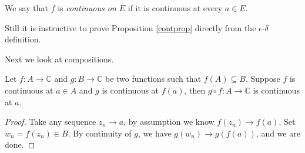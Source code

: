 \begin{note}
    We say that \(f\) is \textit{continuous on \(E\)} if it is continuous at every \(a \in E\).
\end{note}
\begin{remark}
    Still it is instructive to prove Proposition \eqref{contprop} directly from the \(\epsilon\)-\(\delta\) definition.
\end{remark}
Next we look at compositions.
\begin{theorem}
    Let \(f: A \to \mathbb{C}\) and \(g: B \to \mathbb{C}\) be two functions such that \(f(A) \subseteq B\). Suppose \(f\) is continuous at \(a \in A\) and \(g\) is continuous at \(f(a)\), then \(g\circ f: A \to \mathbb{C}\) is continuous at \(a\).
\end{theorem}
\begin{proof}
    Take any sequence \(z_n \to a\), by assumption we know \(f(z_n) \to f(a)\). Set \(w_n = f(z_n) \in B\). By continuity of \(g\), we have \(g(w_n) \to g(f(a))\), and we are done.
\end{proof}
